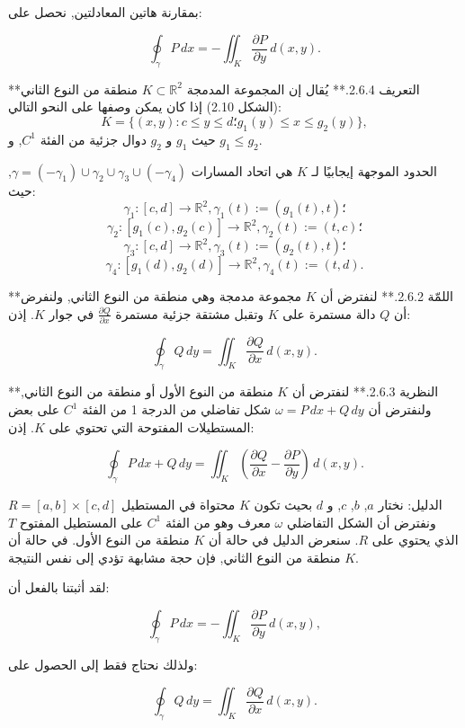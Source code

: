بمقارنة هاتين المعادلتين, نحصل على:

\[ \oint_{\gamma} P \, dx = -\iint_K \frac{\partial P}{\partial y} \, d(x, y). \]

**التعريف 2.6.4.** يُقال إن المجموعة المدمجة \( K \subset \mathbb{R}^2 \) منطقة من النوع الثاني (الشكل 2.10) إذا كان يمكن وصفها على النحو التالي:
\[ K = \{ (x, y) : c \leq y \leq d؛ g_1(y) \leq x \leq g_2(y) \}, \]
حيث \( g_1 \) و \( g_2 \) دوال جزئية من الفئة \( C^1 \), و \( g_1 \leq g_2 \).

الحدود الموجهة إيجابيًا لـ \( K \) هي اتحاد المسارات \( \gamma = (-\gamma_1) \cup \gamma_2 \cup \gamma_3 \cup (-\gamma_4) \), حيث:
\[ \gamma_1 : [c, d] \to \mathbb{R}^2, \gamma_1(t) := (g_1(t), t)؛ \]
\[ \gamma_2 : [g_1(c), g_2(c)] \to \mathbb{R}^2, \gamma_2(t) := (t, c)؛ \]
\[ \gamma_3 : [c, d] \to \mathbb{R}^2, \gamma_3(t) := (g_2(t), t)؛ \]
\[ \gamma_4 : [g_1(d), g_2(d)] \to \mathbb{R}^2, \gamma_4(t) := (t, d). \]


**اللمّة 2.6.2.** لنفترض أن \( K \) مجموعة مدمجة وهي منطقة من النوع الثاني, ولنفرض أن \( Q \) دالة مستمرة على \( K \) وتقبل مشتقة جزئية مستمرة \( \frac{\partial Q}{\partial x} \) في جوار \( K \). إذن:

\[ \oint_{\gamma} Q \, dy = \iint_K \frac{\partial Q}{\partial x} \, d(x, y). \]

**النظرية 2.6.3.** لنفترض أن \( K \) منطقة من النوع الأول أو منطقة من النوع الثاني, ولنفترض أن \( \omega = P \, dx + Q \, dy \) شكل تفاضلي من الدرجة 1 من الفئة \( C^1 \) على بعض المستطيلات المفتوحة التي تحتوي على \( K \). إذن:

\[ \oint_{\gamma} P \, dx + Q \, dy = \iint_K \left( \frac{\partial Q}{\partial x} - \frac{\partial P}{\partial y} \right) \, d(x, y). \]

الدليل: نختار \( a \), \( b \), \( c \), و \( d \) بحيث تكون \( K \) محتواة في المستطيل \( R = [a, b] \times [c, d] \) ونفترض أن الشكل التفاضلي \( \omega \) معرف وهو من الفئة \( C^1 \) على المستطيل المفتوح \( T \) الذي يحتوي على \( R \). سنعرض الدليل في حالة أن \( K \) منطقة من النوع الأول. في حالة أن \( K \) منطقة من النوع الثاني, فإن حجة مشابهة تؤدي إلى نفس النتيجة.

لقد أثبتنا بالفعل أن:

\[ \oint_{\gamma} P \, dx = -\iint_K \frac{\partial P}{\partial y} \, d(x, y), \]

ولذلك نحتاج فقط إلى الحصول على:

\[ \oint_{\gamma} Q \, dy = \iint_K \frac{\partial Q}{\partial x} \, d(x, y). \]

